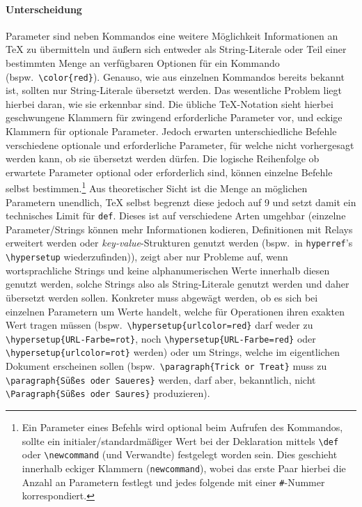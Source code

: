\paragraph{Unterscheidung}\par
Parameter sind neben Kommandos eine weitere Möglichkeit Informationen an \TeX{} zu übermitteln und äußern sich entweder als String-Literale oder Teil einer bestimmten Menge an verfügbaren Optionen für ein Kommando (bspw.\ \verb|\color{red}|). Genauso, wie aus einzelnen Kommandos bereits bekannt ist, sollten nur String-Literale übersetzt werden. Das wesentliche Problem liegt hierbei daran, wie sie erkennbar sind. Die übliche \TeX{}-Notation sieht hierbei geschwungene Klammern für zwingend erforderliche Parameter vor, und eckige Klammern für optionale Parameter. Jedoch erwarten unterschiedliche Befehle verschiedene optionale und erforderliche Parameter, für welche nicht vorhergesagt werden kann, ob sie übersetzt werden dürfen. Die logische Reihenfolge ob erwartete Parameter optional oder erforderlich sind, können einzelne Befehle selbst bestimmen.\footnote{Ein Parameter eines Befehls wird optional beim Aufrufen des Kommandos, sollte ein initialer/standardmäßiger Wert bei der Deklaration mittels \verb"\def" oder \verb"\newcommand" (und Verwandte) festgelegt worden sein. Dies geschieht innerhalb eckiger Klammern (\texttt{newcommand}), wobei das erste Paar hierbei die Anzahl an Parametern festlegt und jedes folgende mit einer \verb|#|-Nummer korrespondiert.}
Aus theoretischer Sicht ist die Menge an möglichen Parametern unendlich, \TeX{} selbst begrenzt diese jedoch auf 9 und setzt damit ein technisches Limit für \texttt{def}. Dieses ist auf verschiedene Arten umgehbar (einzelne Parameter/Strings können mehr Informationen kodieren, Definitionen mit Relays erweitert werden oder \textit{key-value}-Strukturen genutzt werden (bspw.\ in \texttt{hyperref}'s \verb|\hypersetup| wiederzufinden)), zeigt aber nur Probleme auf, wenn wortsprachliche Strings und keine alphanumerischen Werte innerhalb diesen genutzt werden, solche Strings also als String-Literale genutzt werden und daher übersetzt werden sollen. %
Konkreter muss abgewägt werden, ob es sich bei einzelnen Parametern um Werte handelt, welche für Operationen ihren exakten Wert tragen müssen (bspw.\ \verb"\hypersetup{urlcolor=red}" darf weder zu \verb"\hypersetup{URL-Farbe=rot}", noch \verb"\hypersetup{URL-Farbe=red}" oder \verb"\hypersetup{urlcolor=rot}" werden) oder um Strings, welche im eigentlichen Dokument erscheinen sollen (bspw.\ \verb"\paragraph{Trick or Treat}" muss zu \verb"\paragraph{Süßes oder Saueres}" werden, darf aber, bekanntlich, nicht \verb"\Paragraph{Süßes oder Saures}" produzieren). 

